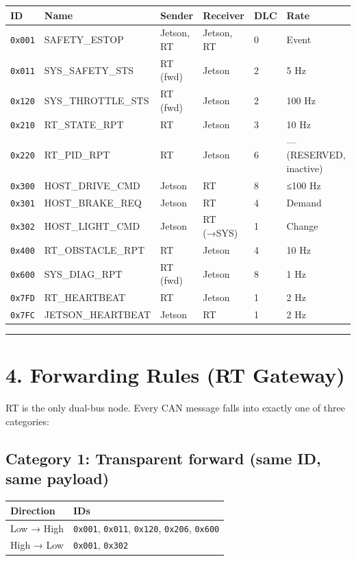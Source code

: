 \begin{longtable}[]{@{}llllll@{}}
\toprule\noalign{}
ID & Name & Sender & Receiver & DLC & Rate \\
\midrule\noalign{}
\endhead
\bottomrule\noalign{}
\endlastfoot
\texttt{0x001} & SAFETY\_ESTOP & Jetson, RT & Jetson, RT & 0 & Event \\
\texttt{0x011} & SYS\_SAFETY\_STS & RT (fwd) & Jetson & 2 & 5 Hz \\
\texttt{0x120} & SYS\_THROTTLE\_STS & RT (fwd) & Jetson & 2 & 100 Hz \\
\texttt{0x210} & RT\_STATE\_RPT & RT & Jetson & 3 & 10 Hz \\
\texttt{0x220} & RT\_PID\_RPT & RT & Jetson & 6 & --- (RESERVED, inactive) \\
\texttt{0x300} & HOST\_DRIVE\_CMD & Jetson & RT & 8 & ≤100 Hz \\
\texttt{0x301} & HOST\_BRAKE\_REQ & Jetson & RT & 4 & Demand \\
\texttt{0x302} & HOST\_LIGHT\_CMD & Jetson & RT (→SYS) & 1 & Change \\
\texttt{0x400} & RT\_OBSTACLE\_RPT & RT & Jetson & 4 & 10 Hz \\
\texttt{0x600} & SYS\_DIAG\_RPT & RT (fwd) & Jetson & 8 & 1 Hz \\
\texttt{0x7FD} & RT\_HEARTBEAT & RT & Jetson & 1 & 2 Hz \\
\texttt{0x7FC} & JETSON\_HEARTBEAT & Jetson & RT & 1 & 2 Hz \\
\end{longtable}

\begin{center}\rule{0.5\linewidth}{0.5pt}\end{center}

\section{4. Forwarding Rules (RT Gateway)}\label{forwarding-rules-rt-gateway}

RT is the only dual-bus node. Every CAN message falls into exactly one of three
categories:

\subsection{Category 1: Transparent forward (same ID, same
payload)}\label{category-1-transparent-forward-same-id-same-payload}

\begin{longtable}[]{@{}ll@{}}
\toprule\noalign{}
Direction & IDs \\
\midrule\noalign{}
\endhead
\bottomrule\noalign{}
\endlastfoot
Low → High & \texttt{0x001}, \texttt{0x011}, \texttt{0x120}, \texttt{0x206},
\texttt{0x600} \\
High → Low & \texttt{0x001}, \texttt{0x302} \\
\end{longtable}

